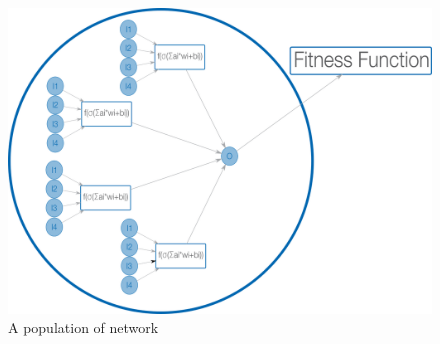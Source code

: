 \documentclass[10pt,a4paper,oneside]{article}
\begin{document}
\begin{figure}[!ht]
\centering
\includegraphics[scale=0.5]{./images/PNG/Population.png}
\caption{A population of network}
\label{pop}
\end{figure}

\vspace{0.8cm}
\end{document}
